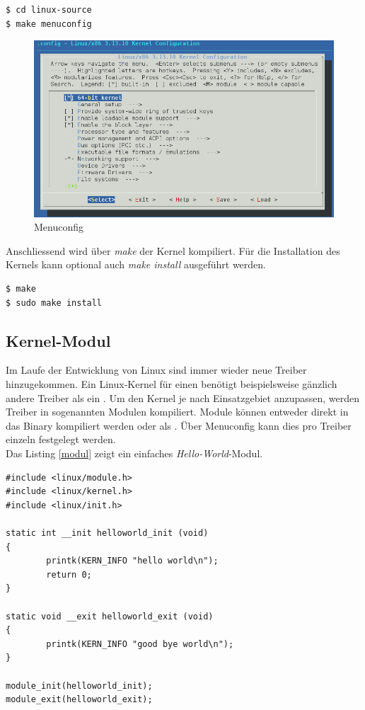 \begin{lstlisting}
$ cd linux-source
$ make menuconfig
\end{lstlisting}

\begin{figure}[h!]
   \begin{center}
      \includegraphics[scale=0.4]{images/menuconfig}
   \end{center}
   \caption[Menuconfig]{Menuconfig}
\end{figure}

Anschliessend wird über \emph{make} der Kernel kompiliert. Für die Installation des Kernels kann
optional auch \emph{make install} ausgeführt werden.

\begin{lstlisting}
$ make
$ sudo make install
\end{lstlisting}

\subsection{Kernel-Modul} 

Im Laufe der Entwicklung von Linux sind immer wieder neue Treiber hinzugekommen. Ein Linux-Kernel für einen 
benötigt beispielsweise gänzlich andere Treiber als ein . Um den Kernel je nach Einsatzgebiet anzupassen, werden
Treiber in sogenannten Modulen kompiliert. Module können entweder direkt in das Binary kompiliert werden oder als .
Über Menuconfig kann dies pro Treiber einzeln festgelegt werden. \\

Das Listing \ref{modul} zeigt ein einfaches \emph{Hello-World}-Modul.
\begin{lstlisting}[label=modul,caption=Hello-World]
#include <linux/module.h>
#include <linux/kernel.h>
#include <linux/init.h>

static int __init helloworld_init (void)
{
        printk(KERN_INFO "hello world\n");
        return 0;
}

static void __exit helloworld_exit (void)
{
        printk(KERN_INFO "good bye world\n");
}

module_init(helloworld_init);
module_exit(helloworld_exit);
\end{lstlisting} \hfill

